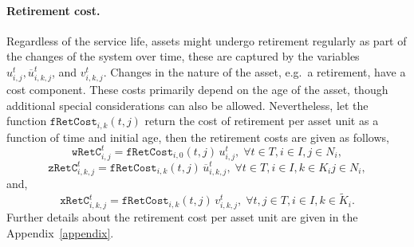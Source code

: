 \documentclass{amsart}
\begin{document}
\paragraph{Retirement cost.}
%
Regardless of the service life, assets might undergo retirement regularly as
part of the changes of the system over time, these are captured by the variables
$u^t_{i,j}, \overline{u}^t_{i,k,j}$, and $v^t_{i,k,j}$. Changes in the nature of
the asset, e.g.\ a retirement, have a cost component. These costs primarily
depend on the age of the asset, though additional special considerations can
also be allowed. Nevertheless, let the function $\mathtt{fRetCost}_{i,k}\!
\left(t,j\right)$ return the cost of retirement per asset unit as a function of
time and initial age, then the retirement costs are given as follows,
%
\begin{equation}
    \mathtt{wRetC}^t_{i,j} = \mathtt{fRetCost}_{i,0}\! \left(t,j\right)\, 
    u^t_{i,j},\; \forall t \in T, i \in I, j \in N_i,
\end{equation}
%
\begin{equation}
    \mathtt{zRetC}^t_{i,k,j} = \mathtt{fRetCost}_{i,k}\! \left(t,j\right)\,
    \overline{u}^t_{i,k,j},\; \forall t \in T, i \in I, k \in K_i
    j \in N_i,
\end{equation}
%
and,
%
\begin{equation}
    \mathtt{xRetC}^t_{i,k,j} = \mathtt{fRetCost}_{i,k}\! \left(t,j\right)\,
    v^t_{i,k,j}
    ,\; \forall 
    t,j \in T, i \in I, k \in \tilde{K}_i.
\end{equation}
%
Further details about the retirement cost per asset unit are given in the
Appendix~\ref{appendix}.
%
\end{document}
